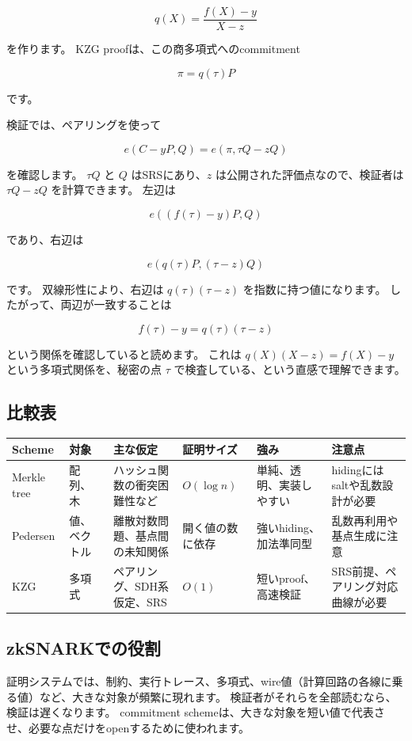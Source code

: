 \documentclass[a4paper,11pt]{ltjsarticle}
\begin{document}
\[
  q(X)=\frac{f(X)-y}{X-z}
\]

を作ります。
KZG proofは、この商多項式へのcommitment

\[
  \pi=q(\tau)P
\]

です。

検証では、ペアリングを使って

\[
  e(C-yP, Q) = e(\pi, \tau Q-zQ)
\]

を確認します。
\(\tau Q\) と \(Q\) はSRSにあり、\(z\) は公開された評価点なので、検証者は \(\tau Q-zQ\) を計算できます。
左辺は

\[
  e((f(\tau)-y)P,Q)
\]

であり、右辺は

\[
  e(q(\tau)P,(\tau-z)Q)
\]

です。
双線形性により、右辺は \(q(\tau)(\tau-z)\) を指数に持つ値になります。
したがって、両辺が一致することは

\[
  f(\tau)-y=q(\tau)(\tau-z)
\]

という関係を確認していると読めます。
これは \(q(X)(X-z)=f(X)-y\) という多項式関係を、秘密の点 \(\tau\) で検査している、という直感で理解できます。

\subsection{比較表}

\begin{center}
\begin{tabularx}{\linewidth}{@{}lYYYYY@{}}
\toprule
Scheme & 対象 & 主な仮定 & 証明サイズ & 強み & 注意点 \\
\midrule
Merkle tree & 配列、木 & ハッシュ関数の衝突困難性など & \(O(\log n)\) & 単純、透明、実装しやすい & hidingにはsaltや乱数設計が必要 \\
Pedersen & 値、ベクトル & 離散対数問題、基点間の未知関係 & 開く値の数に依存 & 強いhiding、加法準同型 & 乱数再利用や基点生成に注意 \\
KZG & 多項式 & ペアリング、SDH系仮定、SRS & \(O(1)\) & 短いproof、高速検証 & SRS前提、ペアリング対応曲線が必要 \\
\bottomrule
\end{tabularx}
\end{center}

\subsection{zkSNARKでの役割}

証明システムでは、制約、実行トレース、多項式、wire値（計算回路の各線に乗る値）など、大きな対象が頻繁に現れます。
検証者がそれらを全部読むなら、検証は遅くなります。
commitment schemeは、大きな対象を短い値で代表させ、必要な点だけをopenするために使われます。
\end{document}
